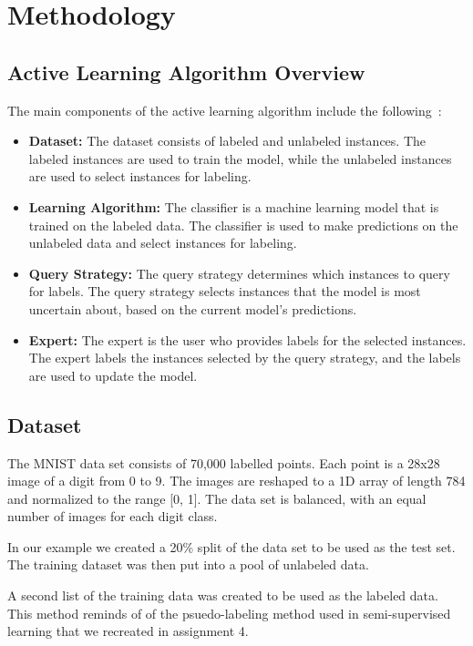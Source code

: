\section{Methodology}

\subsection{Active Learning Algorithm Overview}
The main components of the active learning algorithm include the following~\cite{tharwat2023survey}:
\begin{itemize}
    \item \textbf{Dataset:} The dataset consists of labeled and unlabeled instances. The labeled instances are used to train the model, while the unlabeled instances are used to select instances for labeling.
    \item \textbf{Learning Algorithm:} The classifier is a machine learning model that is trained on the labeled data. The classifier is used to make predictions on the unlabeled data and select instances for labeling.    
    \item \textbf{Query Strategy:} The query strategy determines which instances to query for labels. The query strategy selects instances that the model is most uncertain about, based on the current model's predictions.        
    \item \textbf{Expert:} The expert is the user who provides labels for the selected instances. The expert labels the instances selected by the query strategy, and the labels are used to update the model.
\end{itemize}

\subsection{Dataset}
The MNIST data set consists of 70,000 labelled points. Each point is a 28x28 image of a digit from 0 to 9. 
The images are reshaped to a 1D array of length 784 and normalized to the range [0, 1]. 
The data set is balanced, with an equal number of images for each digit class. \par
In our example we created a 20\% split of the data set to be used as the test set. The training dataset was then put into a pool of unlabeled data.

A second list of the training data was created to be used as the labeled data. This method reminds of of the psuedo-labeling method used in semi-supervised learning that we recreated in assignment 4.\par

